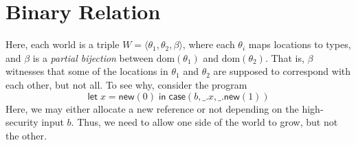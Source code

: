 \documentclass{notes}
\newcommand{\case}[5]{\textsf{case}(#1, #2.#3, #4.#5)}
\newcommand{\new}[1]{\textsf{new}(#1)}
\newcommand{\dom}{\textrm{dom}}
\begin{document}
\section{Binary Relation}
\label{sec:binary-relation}

Here, each world is a triple $W = \langle \theta_1, \theta_2, \beta \rangle$, where each $\theta_i$ maps locations to types, and $\beta$ is a \emph{partial bijection} between $\dom(\theta_1)$ and $\dom(\theta_2)$.
That is, $\beta$ witnesses that some of the locations in $\theta_1$ and $\theta_2$ are supposed to correspond with each other, but not all.
To see why, consider the program
$$\textsf{let}\; x = \new{0} \mathrel{\textsf{in}} \case{b}{\_}{x}{\_}{\new{1}}$$
Here, we may either allocate a new reference or not depending on the high-security input $b$.
Thus, we need to allow one side of the world to grow, but not the other.
\end{document}
